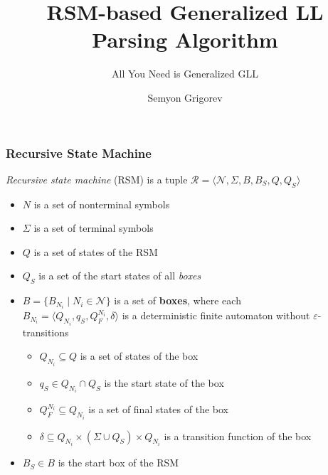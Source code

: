 \documentclass[xcolor=table,aspectratio=169]{beamer}
\title[GLL+RSM]{RSM-based Generalized LL Parsing Algorithm}
\subtitle{All You Need is Generalized GLL}
\author[Semyon Grigorev]{Semyon Grigorev}
\begin{document}
{
\begin{frame}[fragile]
  \titlepage
\end{frame}
}




\begin{frame}[fragile]
  \frametitle{Recursive State Machine}
  \begin{definition}
    \textit{Recursive state machine} (RSM) is a tuple $\mathcal{R} = \langle \mathcal{N},\Sigma,B,B_S,Q,Q_S\rangle$
    \begin{itemize}
       \item $N$ is a set of nonterminal symbols 
       \item $\Sigma$ is a set of terminal symbols 
       \item $Q$ is a set of states of the RSM 
       \item $Q_S$ is a set of the start states of all \textit{boxes} 
       \item $B=\{B_{N_i} \mid N_i \in \mathcal{N}\}$ is a set of \textbf{boxes}, where each \\ $B_{N_i} = \langle Q_{N_i}, q_S, Q_F^{N_i}, \delta \rangle$ is a deterministic finite automaton without $\varepsilon$-transitions  
        \begin{itemize}
            \item $Q_{N_i} \subseteq Q$ is a set of states of the box 
            \item $q_S \in Q_{N_i} \cap Q_S$ is the start state of the box
            \item $Q_F^{N_i} \subseteq Q_{N_i}$ is a set of final states of the box 
            \item $\delta \subseteq Q_{N_i} \times  (\Sigma\cup Q_S) \times Q_{N_i}$ is a transition function of the box
        \end{itemize}
    \item $B_S \in B$ is the start box of the RSM
    \end{itemize}
\end{definition}

\end{frame}
\end{document}
